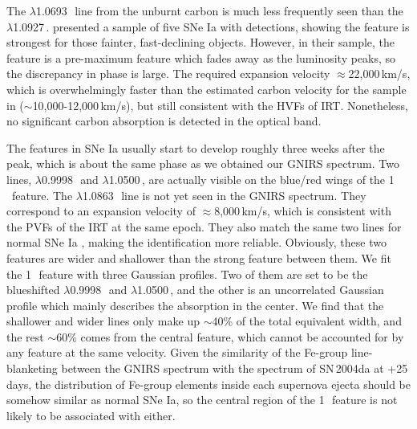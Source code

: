 \documentclass[twocolumn]{aastex631}
\begin{document}
The  $\lambda$1.0693\,\micron\ line from the unburnt carbon is much less frequently seen than the  $\lambda$1.0927\,\micron. \citet{hsiao_CSP_2019} presented a sample of five SNe Ia with  detections, showing the  feature is strongest for those fainter, fast-declining objects. However, in their sample, the  feature is a pre-maximum feature which fades away as the luminosity peaks, so the discrepancy in phase is large. The required expansion velocity $\approx$22,000\,km/s, which is overwhelmingly faster than the estimated carbon velocity for the sample in \citet{hsiao_CSP_2019} ($\sim$10,000-12,000\,km/s), but still consistent with the HVFs of  IRT. Nonetheless, no significant carbon absorption is detected in the optical band.

The  features in SNe Ia usually start to develop roughly three weeks after the peak, which is about the same phase as we obtained our GNIRS spectrum. Two  lines, $\lambda$0.9998\,\micron\ and $\lambda$1.0500\,\micron, are actually visible on the blue/red wings of the 1\,\micron\ feature. The  $\lambda$1.0863\,\micron\ line is not yet seen in the GNIRS spectrum. They correspond to an expansion velocity of $\approx$8,000\,km/s, which is consistent with the PVFs of the  IRT at the same epoch. They also match the same two lines for normal SNe Ia \citep{Marion2009_NIR}, making the identification more reliable. Obviously, these two  features are wider and shallower than the strong feature between them. We fit the 1\,\micron\ feature with three Gaussian profiles. Two of them are set to be the blueshifted  $\lambda$0.9998\,\micron\ and $\lambda$1.0500\,\micron, and the other is an uncorrelated Gaussian profile which mainly describes the absorption in the center. We find that the shallower and wider  lines only make up $\sim$40\% of the total equivalent width, and the rest $\sim$60\% comes from the central feature, which cannot be accounted for by any  feature at the same velocity. Given the similarity of the Fe-group line-blanketing between the GNIRS spectrum with the spectrum of SN\,2004da at +25\,days, the distribution of Fe-group elements inside each supernova ejecta should be somehow similar as normal SNe Ia, so the central region of the 1\,\micron\ feature is not likely to be associated with  either.
\end{document}
